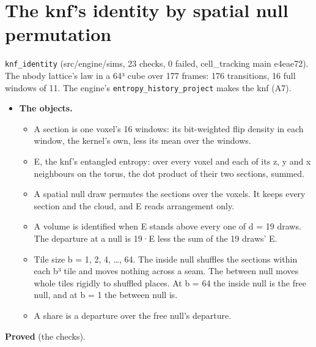 \section{\texorpdfstring{The knf's identity by spatial null permutation}{The knf's identity by spatial null permutation}}

\texttt{knf\_\allowbreak{}identity} (src/engine/sims, 23 checks, 0 failed, cell\_\allowbreak{}tracking main e4eae72). The nbody lattice's law in a 64³ cube over 177 frames: 176 transitions, 16 full windows of 11. The engine's \texttt{entropy\_\allowbreak{}history\_\allowbreak{}project} makes the knf (A7).

\begin{itemize}
\item \textbf{The objects.}

\begin{itemize}
\item A section is one voxel's 16 windows: its bit-weighted flip density in each window, the kernel's own, less its mean over the windows.
\item E, the knf's entangled entropy: over every voxel and each of its z, y and x neighbours on the torus, the dot product of their two sections, summed.
\item A spatial null draw permutes the sections over the voxels. It keeps every section and the cloud, and E reads arrangement only.
\item A volume is identified when E stands above every one of d = 19 draws. The departure at a null is 19·E less the sum of the 19 draws' E.
\item Tile size b = 1, 2, 4, …, 64. The inside null shuffles the sections within each b³ tile and moves nothing across a seam. The between null moves whole tiles rigidly to shuffled places. At b = 64 the inside null is the free null, and at b = 1 the between null is.
\item A share is a departure over the free null's departure.
\end{itemize}
\end{itemize}

\textbf{Proved} (the checks).

